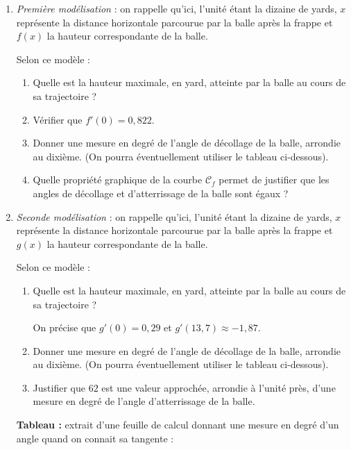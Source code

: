 \begin{enumerate}
\item \emph{Première modélisation} : on rappelle qu'ici, l'unité étant la dizaine de yards, $x$ représente la distance horizontale parcourue par la balle après la frappe et $f(x)$ la hauteur correspondante de la balle.

Selon ce modèle :
	\begin{enumerate}
		\item Quelle est la hauteur maximale, en yard, atteinte par la balle au cours de sa trajectoire ?
		\item Vérifier que $f'(0) = 0,822$.
		\item Donner une mesure en degré de l'angle de décollage de la balle, arrondie au dixième. (On pourra éventuellement utiliser le tableau ci-dessous).
		\item Quelle propriété graphique de la courbe $\mathcal{C}_f$ permet de justifier que les angles de décollage et d'atterrissage de la balle sont égaux ?
	\end{enumerate}
\item \emph{Seconde modélisation } : on rappelle qu'ici, l'unité étant la dizaine de yards, $x$ représente la distance horizontale parcourue par la balle après la frappe et $g(x)$ la hauteur correspondante de la balle.

Selon ce modèle :

	\begin{enumerate}
		\item Quelle est la hauteur maximale, en yard, atteinte par la balle au cours de sa trajectoire ?

On précise que $g'(0) = 0,29$ et $g'(13,7) \approx -1,87$.
		\item Donner une mesure en degré de l'angle de décollage de la balle, arrondie au dixième. (On pourra éventuellement utiliser le tableau ci-dessous).
		\item Justifier que $62$ est une valeur approchée, arrondie à l'unité près, d'une mesure en degré de l'angle d'atterrissage de la balle.
	\end{enumerate}
\medskip

\textbf{Tableau :} extrait d'une feuille de calcul donnant une mesure en degré d'un angle quand on connait sa tangente :


\end{enumerate}
